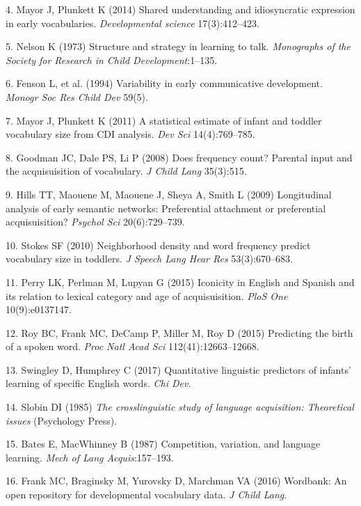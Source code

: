\documentclass[english,man]{apa6}
\theoremstyle{definition}
\theoremstyle{definition}
\theoremstyle{definition}
\theoremstyle{remark}
\begin{document}
\hypertarget{ref-mayor2014}{}
4. Mayor J, Plunkett K (2014) Shared understanding and idiosyncratic
expression in early vocabularies. \emph{Developmental science}
17(3):412--423.

\hypertarget{ref-nelson1973}{}
5. Nelson K (1973) Structure and strategy in learning to talk.
\emph{Monographs of the Society for Research in Child
Development}:1--135.

\hypertarget{ref-fenson1994}{}
6. Fenson L, et al. (1994) Variability in early communicative
development. \emph{Monogr Soc Res Child Dev} 59(5).

\hypertarget{ref-mayor2011}{}
7. Mayor J, Plunkett K (2011) A statistical estimate of infant and
toddler vocabulary size from CDI analysis. \emph{Dev Sci}
14(4):769--785.

\hypertarget{ref-goodman2008}{}
8. Goodman JC, Dale PS, Li P (2008) Does frequency count? Parental input
and the acquisuisition of vocabulary. \emph{J Child Lang} 35(3):515.

\hypertarget{ref-hills2009}{}
9. Hills TT, Maouene M, Maouene J, Sheya A, Smith L (2009) Longitudinal
analysis of early semantic networks: Preferential attachment or
preferential acquisuisition? \emph{Psychol Sci} 20(6):729--739.

\hypertarget{ref-stokes2010}{}
10. Stokes SF (2010) Neighborhood density and word frequency predict
vocabulary size in toddlers. \emph{J Speech Lang Hear Res}
53(3):670--683.

\hypertarget{ref-perry2015}{}
11. Perry LK, Perlman M, Lupyan G (2015) Iconicity in English and
Spanish and its relation to lexical category and age of acquisuisition.
\emph{PloS One} 10(9):e0137147.

\hypertarget{ref-roy2015}{}
12. Roy BC, Frank MC, DeCamp P, Miller M, Roy D (2015) Predicting the
birth of a spoken word. \emph{Proc Natl Acad Sci} 112(41):12663--12668.

\hypertarget{ref-swingley2017}{}
13. Swingley D, Humphrey C (2017) Quantitative linguistic predictors of
infants' learning of specific English words. \emph{Chi Dev}.

\hypertarget{ref-slobin1985}{}
14. Slobin DI (1985) \emph{The crosslinguistic study of language
acquisition: Theoretical issues} (Psychology Press).

\hypertarget{ref-bates1987}{}
15. Bates E, MacWhinney B (1987) Competition, variation, and language
learning. \emph{Mech of Lang Acquis}:157--193.

\hypertarget{ref-frank2016}{}
16. Frank MC, Braginsky M, Yurovsky D, Marchman VA (2016) Wordbank: An
open repository for developmental vocabulary data. \emph{J Child Lang}.
\end{document}
